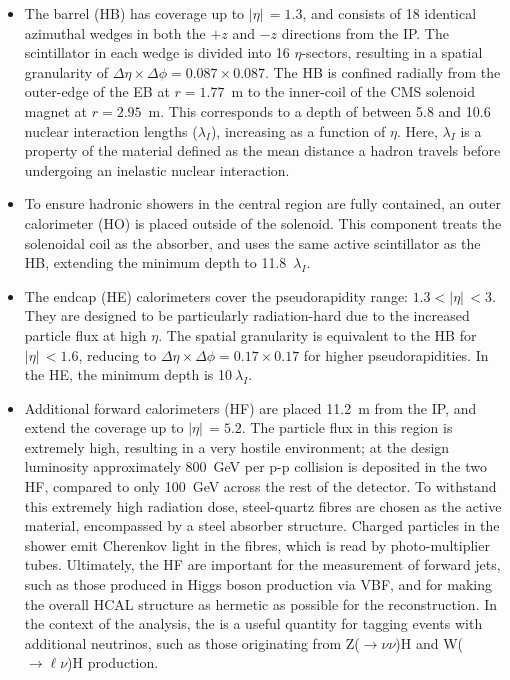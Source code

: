 \begin{itemize}
    \item The barrel (HB) has coverage up to $|\eta|\,=1.3$, and consists of 18 identical azimuthal wedges in both the $+z$ and $-z$ directions from the IP. The scintillator in each wedge is divided into 16 $\eta$-sectors, resulting in a spatial granularity of ${\Delta\eta\times\Delta\phi=0.087\times0.087}$. The HB is confined radially from the outer-edge of the EB at $r=1.77$~m to the inner-coil of the CMS solenoid magnet at $r=2.95$~m. This corresponds to a depth of between 5.8 and 10.6 nuclear interaction lengths ($\lambda_I$), increasing as a function of $\eta$. Here, $\lambda_I$ is a property of the material defined as the mean distance a hadron travels before undergoing an inelastic nuclear interaction.
    \item To ensure hadronic showers in the central region are fully contained, an outer calorimeter (HO) is placed outside of the solenoid. This component treats the solenoidal coil as the absorber, and uses the same active scintillator as the HB, extending the minimum depth to 11.8~$\lambda_I$.
    \item The endcap (HE) calorimeters cover the pseudorapidity range: $1.3<|\eta|\,<3$. They are designed to be particularly radiation-hard due to the increased particle flux at high $\eta$. The spatial granularity is equivalent to the HB for $|\eta|\,<1.6$, reducing to ${\Delta\eta\times\Delta\phi=0.17\times0.17}$ for higher pseudorapidities. In the HE, the minimum depth is 10$~\lambda_I$.
    \item Additional forward calorimeters (HF) are placed 11.2~m from the IP, and extend the coverage up to $|\eta|\,=5.2$. The particle flux in this region is extremely high, resulting in a very hostile environment; at the design luminosity approximately 800~GeV per p-p collision is deposited in the two HF, compared to only 100~GeV across the rest of the detector. To withstand this extremely high radiation dose, steel-quartz fibres are chosen as the active material, encompassed by a steel absorber structure. Charged particles in the shower emit Cherenkov light in the fibres, which is read by photo-multiplier tubes. Ultimately, the HF are important for the measurement of forward jets, such as those produced in Higgs boson production via VBF, and for making the overall HCAL structure as hermetic as possible for the \met reconstruction. In the context of the \Hgg analysis, the \met is a useful quantity for tagging events with additional neutrinos, such as those originating from Z($\rightarrow\nu\nu$)H and W($\rightarrow \ell\nu$)H production.
\end{itemize}

